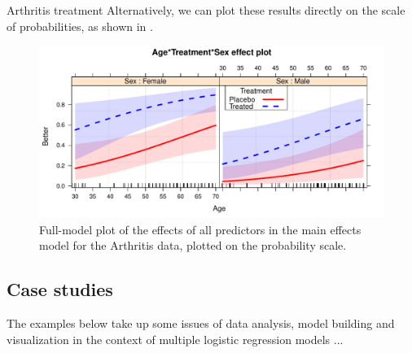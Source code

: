 \documentclass[11pt]{book}
\renewenvironment{knitrout}{\small\renewcommand{\baselinestretch}{.85}}{} %
\begin{document}
\begin{Example}{Arthritis treatment}
\begin{knitrout}
\end{knitrout}
Alternatively, we can plot these results directly on the scale of probabilities, as
shown in .
\begin{knitrout}
\color{fgcolor}\begin{kframe}
\begin{alltt}
 \hlstd{=}\hlstd{,} \hlstd{=}\hlstd{,} \hlstd{=}\hlstd{,}
      \hlstd{=} \hlstd{(}\hlstd{,} \hlstd{),} \hlstd{=}\hlstd{,}
     \hlstd{=}\hlstd{(}\hlstd{=}\hlstd{,} \hlstd{=}\hlstd{),} \hlstd{=}\hlstd{)}
\end{alltt}
\end{kframe}\begin{figure}[!htbp]


\centerline{\includegraphics[width=.8\textwidth]{ch07/fig/arth-effplot3} }

\caption[Full-model plot of the effects of all predictors in the main effects model for the Arthritis data, plotted on the probability scale]{Full-model plot of the effects of all predictors in the main effects model for the Arthritis data, plotted on the probability scale.\label{fig:arth-effplot3}}
\end{figure}


\end{knitrout}

\end{Example}

\subsection{Case studies}

The examples below take up some issues of data analysis, model building and visualization
in the context of multiple logistic regression models ...
\end{document}
